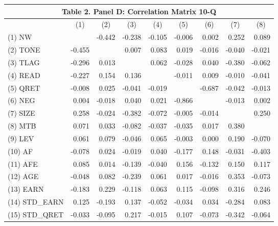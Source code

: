 \begin{table}[H] \label{T2PD}
	\centering
	\begin{tabular}{lrrrrrrrr}
		\multicolumn{9}{c}{\textbf{Table 2. Panel D: Correlation Matrix 10-Q}} \\
		\midrule
		\midrule
		& \multicolumn{1}{c}{(1)} & \multicolumn{1}{c}{(2)} & \multicolumn{1}{c}{(3)} & \multicolumn{1}{c}{(4)} & \multicolumn{1}{c}{(5)} & \multicolumn{1}{c}{(6)} & \multicolumn{1}{c}{(7)} & \multicolumn{1}{c}{(8)} \\
		\midrule
		(1) NW &  & -0.442 & -0.238 & -0.105 & -0.006 & 0.002 & 0.252 & 0.089 \\
		(2) TONE & -0.455 &  & 0.007 & 0.083 & 0.019 & -0.016 & -0.040 & -0.021 \\
		(3) TLAG & -0.296 & 0.013 &  & 0.062 & -0.028 & 0.040 & -0.380 & -0.062 \\
		(4) READ & -0.227 & 0.154 & 0.136 &  & -0.011 & 0.009 & -0.010 & -0.041 \\
		(5) QRET & -0.008 & 0.025 & -0.041 & -0.019 &  & -0.687 & -0.042 & -0.013 \\
		(6) NEG & 0.004 & -0.018 & 0.040 & 0.021 & -0.866 &  & -0.013 & 0.002 \\
		(7) SIZE & 0.258 & -0.024 & -0.382 & -0.072 & -0.005 & -0.014 &  & 0.250 \\
		(8) MTB & 0.071 & 0.033 & -0.082 & -0.037 & -0.035 & 0.017 & 0.380 &  \\
		(9) LEV & 0.061 & 0.079 & -0.046 & 0.065 & -0.003 & 0.000 & 0.190 & -0.070 \\
		(10) AF & -0.078 & 0.024 & -0.019 & 0.040 & -0.177 & 0.148 & -0.031 & -0.403 \\
		(11) AFE & 0.085 & 0.014 & -0.139 & -0.040 & 0.156 & -0.132 & 0.150 & 0.117 \\
		(12) AGE & -0.048 & 0.082 & -0.239 & 0.061 & 0.017 & -0.016 & 0.353 & -0.073 \\
		(13) EARN & -0.183 & 0.229 & -0.118 & 0.063 & 0.115 & -0.098 & 0.316 & 0.246 \\
		(14) STD\_EARN & 0.125 & -0.193 & 0.137 & -0.052 & -0.034 & 0.034 & -0.284 & 0.083 \\
		(15) STD\_QRET & -0.033 & -0.095 & 0.217 & -0.015 & 0.107 & -0.073 & -0.342 & -0.064 \\
		\bottomrule
		\bottomrule
	\end{tabular}%
\end{table}%